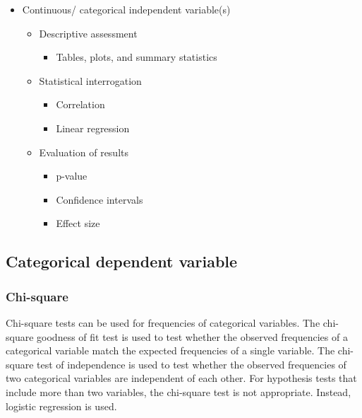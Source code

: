 \documentclass[
  letterpaper,
]{latex/krantz}
\providecommand{\tightlist}{%
  \setlength{\itemsep}{0pt}\setlength{\parskip}{0pt}}\usepackage{longtable,booktabs,array}
\begin{document}
\begin{itemize}
  \begin{itemize}
  \tightlist
  \item
    Continuous/ categorical independent variable(s)

    \begin{itemize}
    \tightlist
    \item
      Descriptive assessment

      \begin{itemize}
      \tightlist
      \item
        Tables, plots, and summary statistics
      \end{itemize}
    \item
      Statistical interrogation

      \begin{itemize}
      \tightlist
      \item
        Correlation
      \item
        Linear regression
      \end{itemize}
    \item
      Evaluation of results

      \begin{itemize}
      \tightlist
      \item
        p-value
      \item
        Confidence intervals
      \item
        Effect size
      \end{itemize}
    \end{itemize}
  \end{itemize}
\end{itemize}

\hypertarget{ida-categorical-dependent-variable}{%
\subsection{Categorical dependent
variable}\label{ida-categorical-dependent-variable}}

\hypertarget{ida-chi-square}{%
\subsubsection{Chi-square}\label{ida-chi-square}}

Chi-square tests can be used for frequencies of categorical variables.
The chi-square goodness of fit test is used to test whether the observed
frequencies of a categorical variable match the expected frequencies of
a single variable. The chi-square test of independence is used to test
whether the observed frequencies of two categorical variables are
independent of each other. For hypothesis tests that include more than
two variables, the chi-square test is not appropriate. Instead, logistic
regression is used.
\end{document}
